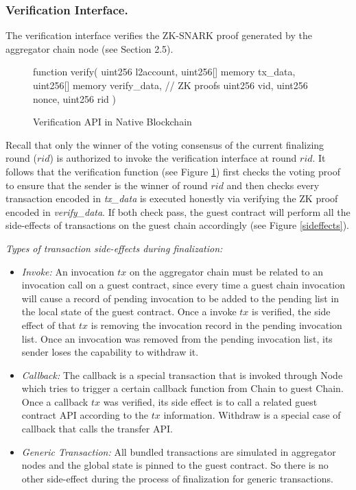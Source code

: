 \subsubsection*{Verification Interface.}
The verification interface verifies the ZK-SNARK proof generated by the aggregator chain node (see Section 2.5).
\begin{figure}[!ht]
\begin{code}
function verify(
  uint256 l2account,
  uint256[] memory tx_data,
  uint256[] memory verify_data, // ZK proofs 
  uint256 vid,
  uint256 nonce,
  uint256 rid
)
\end{code}
\caption{Verification API in Native Blockchain}
\label{fig:verify-api}
\end{figure}

Recall that only the winner of the voting consensus of the current finalizing round ($rid$) is authorized to invoke the verification interface at round $rid$. It follows that the verification function (see Figure \ref{fig:verify-api}) first checks the voting proof to ensure that the sender is the winner of round $rid$ and then checks every transaction encoded in {\it tx\_data} is executed honestly via verifying the ZK proof encoded in {\it verify\_data}. If both check pass, the guest contract will perform all the side-effects of transactions on the guest chain accordingly (see Figure \ref{sideffects}).

\smallskip\noindent\emph{Types of transaction side-effects during finalization:}
\begin{itemize}[leftmargin=*]
\item \emph{Invoke:}
    An invocation $tx$ on the aggregator chain must be related to an invocation call on a guest contract, since every time a guest chain invocation will cause a record of pending invocation to be added to the pending list in the local state of the guest contract.
    Once a invoke $tx$ is verified, the side effect of that $tx$ is removing the invocation record in the pending invocation list.
    Once an invocation was removed from the pending invocation list, its sender loses the capability to withdraw it.

\item \emph{Callback:}
    The callback is a special transaction that is invoked through \dprotocol Node which tries to trigger a certain callback function from \dprotocol Chain to guest Chain.
    Once a callback $tx$ was verified, its side effect is to call a related guest contract API according to the $tx$ information.
    Withdraw is a special case of callback that calls the transfer API.

\item \emph{Generic Transaction:}
    All bundled transactions are simulated in aggregator nodes and the global state is pinned to the guest contract. So there is no other side-effect during the process of finalization for generic transactions.
\end{itemize}
